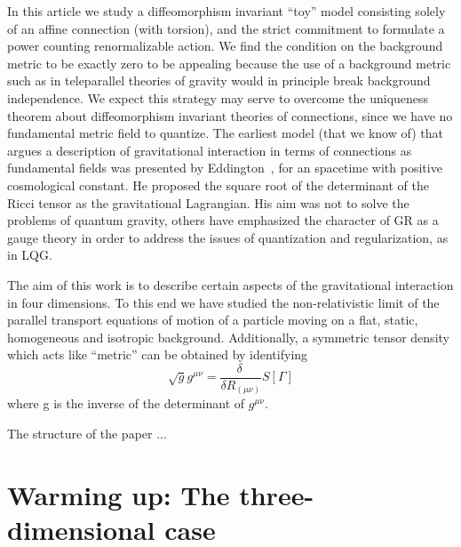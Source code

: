 \documentclass[twocolumn,
  showpacs,showkeys,prd,superscriptaddress]{revtex4-1}
\newcommand{\hl}[1]{{\color{red} \textbf{#1}}}
\begin{document}
In this article we study a diffeomorphism invariant ``toy'' model  consisting  solely of an affine connection  (with torsion), and the strict commitment to formulate a power counting renormalizable action.  We find the condition on the background metric to be exactly zero to be appealing because the use of a background metric such as in teleparallel theories of gravity would in principle break background independence. We expect  this strategy may serve to overcome  the uniqueness theorem about diffeomorphism invariant theories of connections, since we  have no fundamental metric field to quantize. The earliest model (that we know of) that argues  a description of gravitational interaction in terms of connections as fundamental fields  was presented by Eddington~\cite{Eddington1923math}, for an spacetime with positive cosmological constant. He proposed the square root of the determinant of the Ricci tensor as the gravitational Lagrangian. His aim was not to solve the problems of quantum gravity,  others have emphasized the character of GR as a gauge theory in order to address the issues of quantization and regularization, as in LQG.

The aim of this work is to describe certain aspects of the gravitational interaction in four dimensions. To this end we have studied the non-relativistic limit of the parallel transport equations of motion of a particle moving on a flat, static, homogeneous and isotropic background. Additionally, a  symmetric tensor density which acts like ``metric'' can be obtained by identifying
\begin{equation}\label{metric}
  \sqrt{g}g^{\mu\nu} = \frac{\delta\ }{\delta R_{(\mu\nu)}} S[\Gamma]
\end{equation}
where g is the inverse of the determinant of $g^{\mu\nu}$.

The structure of the paper ...




\section{Warming up: The three-dimensional case}
\end{document}
